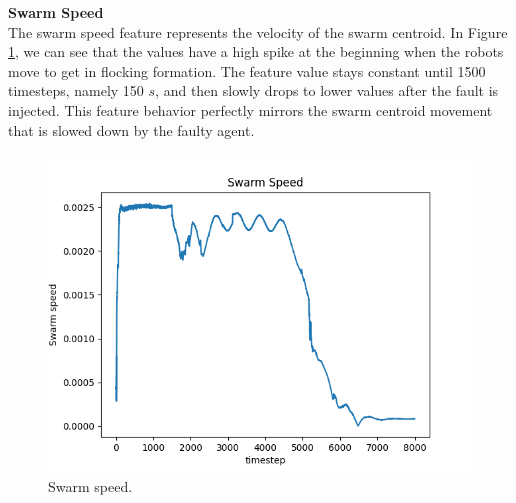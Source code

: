 \documentclass[../../Thesis.tex]{subfiles}
\begin{document}
					\textbf{Swarm Speed} \\
					The swarm speed feature represents the velocity of the swarm centroid. In Figure \ref{fig:flocking_swarm_speed}, we can see that the values have a high spike at the beginning when the robots move to get in flocking formation. The feature value stays constant until 1500 timesteps, namely 150 $s$, and then slowly drops to lower values after the fault is injected. This feature behavior perfectly mirrors the swarm centroid movement that is slowed down by the faulty agent.
					\begin{figure}
						\centering
						\includegraphics[scale=0.4]{../../Images/Experiments/flocking_15_East_6_percent_rotating_fault_after_1500_gain_1000/Swarm_speed.png}
						\caption{Swarm speed.}
						\label{fig:flocking_swarm_speed}
					\end{figure}
\end{document}
